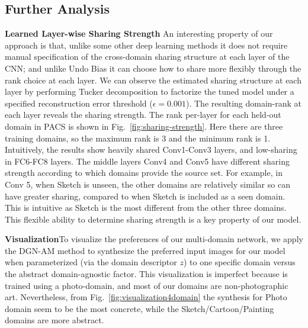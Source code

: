 \documentclass[10pt,twocolumn,letterpaper]{article}
\begin{document}
\subsection{Further Analysis}
\noindent\textbf{Learned Layer-wise Sharing Strength}\quad 
An interesting property of our approach is that, unlike some other deep learning methods \cite{ganin2015udaBackprop,long2015deepAdaptationNetworks} it does not require manual specification of the cross-domain sharing structure at each layer of the CNN; and unlike Undo Bias \cite{ECCV12_Khosla} it can choose how to share more flexibly through the rank choice at each layer. We can observe the estimated sharing structure at each layer by performing Tucker decomposition to factorize the tuned model under a specified reconstruction error threshold ($\epsilon=0.001$). The resulting domain-rank at each layer reveals the sharing strength. 
The rank per-layer for each held-out domain in PACS is shown in Fig.~\ref{fig:sharing-strength}. Here there are three training domains, so the maximum rank is 3 and the minimum rank is 1. Intuitively, the results show heavily shared Conv1-Conv3 layers, and low-sharing in FC6-FC8 layers. The middle layers Conv4 and Conv5 have different sharing strength according to which domains provide the source set. For example, in Conv 5, when Sketch is unseen, the other domains are relatively similar so can have greater sharing, compared to when Sketch is included as a seen domain. This is intuitive as Sketch is the most different from the other three domains. This flexible ability to determine sharing strength is a key property of our model. 





\vspace{0.1cm}\noindent\textbf{Visualization}\quad To visualize the preferences of our multi-domain network, we apply the DGN-AM \cite{DBLP:journals/corr/NguyenDYBC16} method to synthesize the preferred input images for our model when parameterized (via the domain descriptor $z$) to one specific domain versus the abstract domain-agnostic factor. This visualization is imperfect because  \cite{DBLP:journals/corr/NguyenDYBC16} is trained using a photo-domain, and most of our domains are non-photographic art. 
Nevertheless, from  Fig.~\ref{fig:visualization4domain} the synthesis for Photo  domain seem to be the most concrete, while the Sketch/Cartoon/Painting domains are more abstract. 
\end{document}
